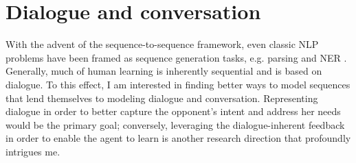 \documentclass[11pt]{article}
\begin{document}
\section{Dialogue and conversation}

With the advent of the sequence-to-sequence framework, even classic NLP problems have been framed as sequence generation tasks, e.g. parsing \cite{Vinyals2014a} and NER \cite{Gillick2015}. Generally, much of human learning is inherently sequential and is based on dialogue. To this effect, I am interested in finding better ways to model sequences that lend themselves to modeling dialogue and conversation. Representing dialogue in order to better capture the opponent's intent and address her needs would be the primary goal; conversely, leveraging the dialogue-inherent feedback \cite{Mikolov2015,Weston2016} in order to enable the agent to learn is another research direction that profoundly intrigues me.



\end{document}
